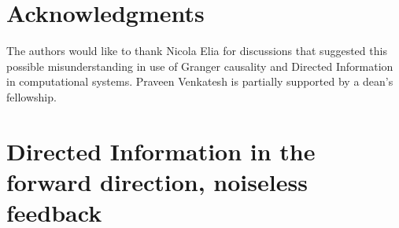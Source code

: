 \documentclass[letterpaper, 10pt, conference]{ieeeconf}
\begin{document}



\section*{Acknowledgments}

The authors would like to thank Nicola Elia for discussions that suggested this possible misunderstanding in use of Granger causality and Directed Information in computational systems. Praveen Venkatesh is partially supported by a dean's fellowship. %




\newpage

\appendices

\section{Directed Information in the forward direction, noiseless feedback}
\label{app:dir-info-fwd-noiseless}
\end{document}
